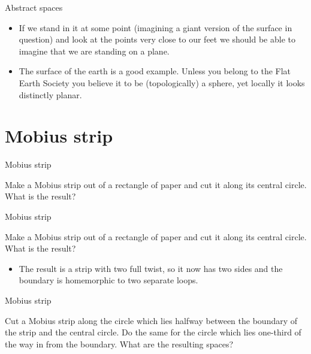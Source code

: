 \documentclass{beamer}
\begin{document}
\begin{frame}{Abstract spaces}
  \begin{definition}[Surface]
    \begin{itemize}
    \item If we stand in it at some point (imagining a giant version of the surface in question) and look at the points very close to our feet we should be able to imagine that we are standing on a plane.
    \item The surface of the earth is a good example. Unless you belong to the Flat Earth Society you believe it to be (topologically) a sphere, yet locally it looks distinctly planar.
    \end{itemize}
  \end{definition}
\end{frame}

\section{Mobius strip}

\begin{frame}{Mobius strip}
  \begin{block}{}
    Make a Mobius strip out of a rectangle of paper and cut it along its central circle. What is the result?
  \end{block}
\end{frame}

\begin{frame}{Mobius strip}
  \begin{block}{}
    Make a Mobius strip out of a rectangle of paper and cut it along its central circle. What is the result?
    \begin{itemize}
    \item The result is a strip with two full twist, so it now has two sides and the boundary is homemorphic to two separate loops.
    \end{itemize}
  \end{block}
\end{frame}

\begin{frame}{Mobius strip}
  \begin{block}{}
    Cut a Mobius strip along the circle which lies halfway between the boundary of the strip and the central circle. Do the same for the circle which lies one-third of the way in from the boundary. What are the resulting spaces?
  \end{block}
\end{frame}
\end{document}
